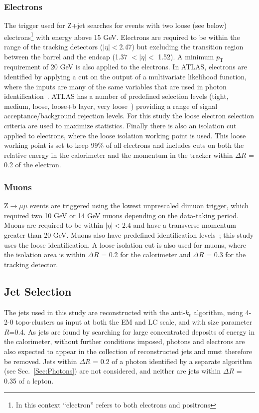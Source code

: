 \subsubsection{Electrons}
The trigger used for Z+jet searches for events with two loose (see below) electrons\footnote{In this context ``electron'' refers to both electrons and positrons} with energy above 15 GeV.  
Electrons are required to be within the range of the tracking detectors ($\mid\eta\mid<$2.47) but excluding the transition region between the barrel and the endcap (1.37 $<\mid\eta\mid<$ 1.52).  
A minimum $p_{\mathrm T}$ requirement of 20 GeV is also applied to the electrons.  
In ATLAS, electrons are identified by applying a cut on the output of a multivariate likelihood function, where the inputs are many of the same variables that are used in photon identification~\cite{ATL-PHYS-PUB-2015-041}.  
ATLAS has a number of predefined selection levels (tight, medium, loose, loose+b layer, very loose~\cite{ATL-PHYS-PUB-2015-041}) providing a range of signal acceptance/background rejection levels.  
For this study the loose electron selection criteria are used to maximize statistics.  
Finally there is also an isolation cut applied to electrons, where the loose isolation working point is used.  
This loose working point is set to keep 99\% of all electrons and includes cuts on both the relative energy in the calorimeter and the momentum in the tracker within $\Delta R$ = 0.2 of the electron.  


\subsubsection{Muons}
Z$\rightarrow\mu\mu$ events are triggered using the lowest unprescaled dimuon trigger, which required two 10 GeV or 14 GeV muons depending on the data-taking period.   
Muons are required to be within ${\mid\eta\mid<2.4}$ and have a transverse momentum greater than 20 GeV.  
Muons also have predefined identification levels~\cite{ATL-PHYS-PUB-2015-037}; this study uses the loose identification.  
A loose isolation cut is also used for muons, where the isolation area is within $\Delta R$ = 0.2 for the calorimeter and $\Delta R$ = 0.3 for the tracking detector.  

\subsection{Jet Selection}
The jets used in this study are reconstructed with the anti-$k_t$ algorithm, using 4-2-0 topo-clusters as input at both the EM and LC scale, and with size parameter $R$=0.4.  
As jets are found by searching for large concentrated deposits of energy in the calorimeter, without further conditions imposed, photons and electrons are also expected to appear in the collection of reconstructed jets and must therefore be removed.  
Jets within $\Delta R$ = 0.2 of a photon identified by a separate algorithm (see Sec.~\ref{Sec:Photons}) are not considered, and neither are jets within $\Delta R$ = 0.35 of a lepton.  

